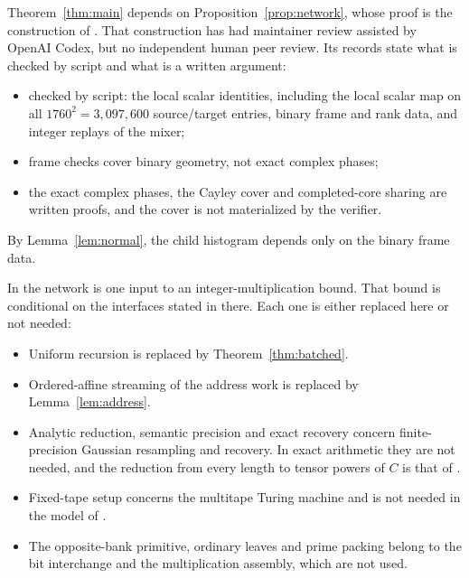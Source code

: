\documentclass[11pt]{article}
\theoremstyle{definition}
\begin{document}
Theorem~\ref{thm:main} depends on Proposition~\ref{prop:network}, whose proof
is the construction of \cite{cms}. That construction has had maintainer review
assisted by OpenAI Codex, but no independent human peer review. Its records
state what is checked by script and what is a written argument:
\begin{itemize}
\item checked by script: the local scalar identities, including the local
  scalar map on all $1760^2=3{,}097{,}600$ source/target entries, binary frame
  and rank data, and integer replays of the mixer;
\item frame checks cover binary geometry, not exact complex phases;
\item the exact complex phases, the Cayley cover and completed-core sharing are
  written proofs, and the cover is not materialized by the verifier.
\end{itemize}
By Lemma~\ref{lem:normal}, the child histogram depends only on the binary frame
data.

In \cite{cms} the network is one input to an integer-multiplication bound.
That bound is conditional on the interfaces stated in
 there. Each one is either replaced here or not
needed:
\begin{itemize}
\item Uniform recursion is replaced by Theorem~\ref{thm:batched}.
\item Ordered-affine streaming of the address work is replaced by
  Lemma~\ref{lem:address}.
\item Analytic reduction, semantic precision and exact recovery concern
  finite-precision Gaussian resampling and recovery. In exact arithmetic they
  are not needed, and the reduction from every length to tensor powers of $C$ is
  that of \cite[\S\S3--5]{oai-dft}.
\item Fixed-tape setup concerns the multitape Turing machine and is not needed
  in the model of \cite[\S1.1]{oai-dft}.
\item The opposite-bank primitive, ordinary leaves and prime packing belong to
  the bit interchange and the multiplication assembly, which are not used.
\end{itemize}
\end{document}
